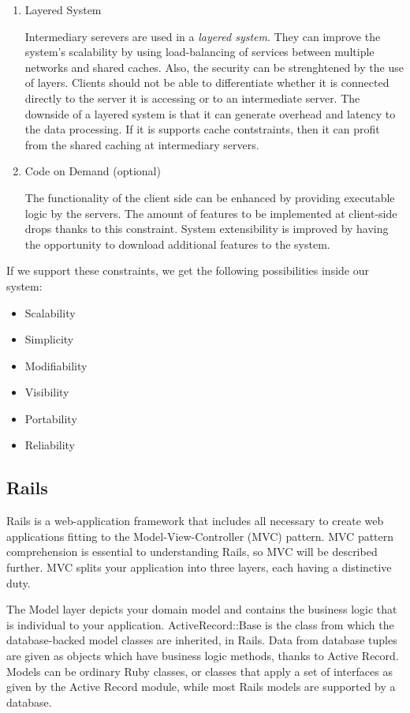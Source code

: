 \begin{enumerate}[label=\arabic*)]
  \item Layered System

    Intermediary serevers are used in a \textit{layered system}. They can improve the system's scalability by using load-balancing of services between multiple networks and shared caches. Also, the security can be strenghtened by the use of layers. Clients should not be able to differentiate whether it is connected directly to the server it is accessing or to an intermediate server.
    The downside of a layered system is that it can generate overhead and latency to the data processing. If it is supports cache contstraints, then it can profit from the shared caching at intermediary servers.

  \item Code on Demand (optional)

    The functionality of the client side can be enhanced by providing executable logic by the servers. The amount of features to be implemented at client-side drops thanks to this constraint. System extensibility is improved by having the opportunity to download additional features to the system.

\end{enumerate}

If we support these constraints, we get the following possibilities inside our system:
\begin{itemize} 
  \item Scalability
  \item Simplicity
  \item Modifiability
  \item Visibility
  \item Portability
  \item Reliability
\end{itemize}


\subsection{Rails}

Rails is a web-application framework that includes all necessary to create web applications fitting to the Model-View-Controller (MVC) pattern.
MVC pattern comprehension is essential to understanding Rails, so MVC will be described further.
MVC splits your application into three layers, each having a distinctive duty.

The Model layer depicts your domain model and contains the business logic that is individual to your application. ActiveRecord::Base is the class from which the database-backed model classes are inherited, in Rails. Data from database tuples are given as objects which have business logic methods, thanks to Active Record. Models can be ordinary Ruby classes, or classes that apply a set of interfaces as given by the Active Record module, while most Rails models are supported by a database.

